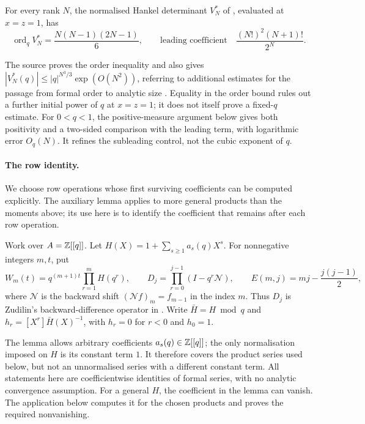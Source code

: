 \documentclass[11pt]{article}
\begin{document}
\begin{theorem}\label{long1049:res:zudilin-sharp-qorder}
For every rank $N$, the normalised Hankel determinant $V_N^{*}$ of
\cite[Sec.~4, (6), p.~6]{zudilin2016}, evaluated at $x=z=1$, has
\[
 \operatorname{ord}_q V_N^{*}=\frac{N(N-1)(2N-1)}{6},
 \qquad
 \text{leading coefficient}\quad\frac{(N!)^{2}(N+1)!}{2^{N}} .
\]
\end{theorem}

\noindent The source proves the order inequality and also gives
$|V_N^*(q)|\le |q|^{N^3/3}\exp(O(N^2))$, referring to additional estimates
for the passage from formal order to analytic size
\cite[Sec.~4, p.~7]{zudilin2016}.
Equality in the order bound rules out a further initial power of $q$ at
$x=z=1$; it does not itself prove a fixed-$q$ estimate.
For $0<q<1$, the positive-measure argument below gives both positivity
and a two-sided comparison with the leading term, with logarithmic error
$O_q(N)$. It refines the subleading control, not the cubic exponent of $q$.

\paragraph{The row identity.}
We choose row operations whose first surviving coefficients can be
computed explicitly. The auxiliary lemma applies to more general
products than the moments above; its use here is to identify the
coefficient that remains after each row operation.

Work over $A=\mathbb{Z}[[q]]$. Let $H(X)=1+\sum_{s\ge1}a_s(q)X^s$.
For nonnegative integers $m,t$, put
\[
 W_m(t)=q^{(m+1)t}\prod_{r=1}^{m}H(q^{r}),
 \qquad
 D_j=\prod_{r=0}^{j-1}(I-q^{r}\mathcal N),
 \qquad
 E(m,j)=mj-\frac{j(j-1)}2,
\]
where $\mathcal N$ is the backward shift $(\mathcal Nf)_m=f_{m-1}$ in the index
$m$. Thus $D_j$ is Zudilin's backward-difference operator in
\cite[Sec.~4, (7), p.~6]{zudilin2016}.  Write $\bar H=H\bmod q$ and
$h_r=[X^{r}]\bar H(X)^{-1}$, with $h_r=0$ for $r<0$ and $h_0=1$.

The lemma allows arbitrary coefficients $a_s(q)\in\mathbb{Z}[[q]]$; the only
normalisation imposed on $H$ is its constant term $1$. It therefore
covers the product series used below, but not an unnormalised series
with a different constant term. All statements here are coefficientwise
identities of formal series, with no analytic convergence assumption.
For a general $H$, the coefficient in the lemma can vanish. The
application below computes it for the chosen products and proves the
required nonvanishing.
\end{document}
